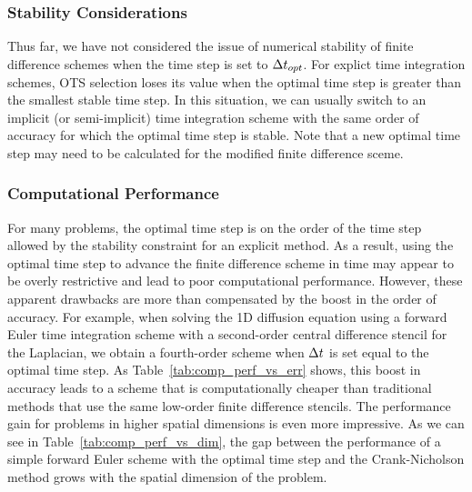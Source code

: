 \documentclass[oneeqnum,onefignum,onetabnum,onethmnum]{siamltex}
\begin{document}
\subsubsection*{Stability Considerations}
Thus far, we have not considered the issue of numerical stability of finite
difference schemes when the time step is set to $\Delta t_{opt}$.  For explict time 
integration schemes, OTS selection loses its value when the optimal time step 
is greater than the smallest stable time step.  In this situation, we can 
usually switch to an implicit (or semi-implicit) time integration scheme with 
the same order of accuracy for which the optimal time step is stable.  Note 
that a new optimal time step may need to be calculated for the modified finite
difference sceme.


\subsubsection*{\label{sec:computational_performance} 
                Computational Performance}
For many problems, the optimal time step is on the order of the time step 
allowed by the stability constraint for an explicit method.  
As a result, using the optimal time step to advance the finite
difference scheme in time may appear to be overly restrictive and lead to poor 
computational performance.  However, these apparent drawbacks are more than 
compensated by the boost in the order of accuracy.  For example, when solving 
the 1D diffusion equation using a forward Euler time integration scheme with a 
second-order central difference stencil for the Laplacian, we obtain a 
fourth-order scheme when $\Delta t$ is set equal to the optimal time step.  As
Table~\ref{tab:comp_perf_vs_err} shows, this boost in accuracy leads to a
scheme that is computationally cheaper than traditional methods that use 
the same low-order finite difference stencils.  The performance gain for 
problems in higher spatial dimensions is even more impressive.  As we can see 
in Table~\ref{tab:comp_perf_vs_dim}, the gap between the performance of a
simple forward Euler scheme with the optimal time step and the Crank-Nicholson
method grows with the spatial dimension of the problem.  
\end{document}
